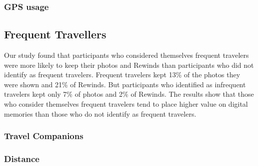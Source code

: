 \documentclass{sigchi}
\begin{document}
\subsubsection{GPS usage}

\subsection{Frequent Travellers}
Our study found that participants who considered themselves frequent travelers were more likely to keep their photos and Rewinds than participants who did not identify as frequent travelers. Frequent travelers kept 13\% of the photos they were shown and 21\% of Rewinds. But participants who identified as infrequent travelers kept only 7\% of photos and 2\% of Rewinds. The results show that those who consider themselves frequent travelers tend to place higher value on digital memories than those who do not identify as frequent travelers.

\subsubsection{Travel Companions}

\subsubsection{Distance}
\end{document}
